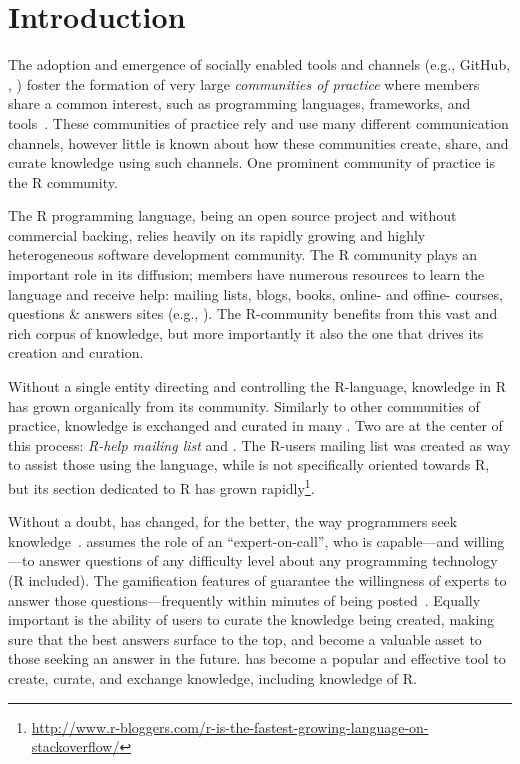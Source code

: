 \section{Introduction}
\label{cha:introduction}
The adoption and emergence of socially enabled tools and channels (e.g., GitHub, \SO, \ml) foster the formation of very large \textit{communities of practice} where members share a common interest, such as programming languages, frameworks, and tools~\cite{Storey2014}. These communities of practice rely and use many different communication channels, however little is known about how these communities create, share, and curate knowledge using such channels. One prominent community of practice is the R community.

The R programming language, being an open source project and without commercial backing, relies heavily on its rapidly growing and highly heterogeneous software development community. The R community plays an important role in its diffusion; members have numerous resources to learn the language and receive help: mailing lists, blogs, books, online- and offine- courses, questions \& answers sites (e.g., \SO). The R-community benefits from this vast and rich corpus of knowledge, but more importantly it also the one that drives its creation and curation.

Without a single entity directing and controlling the R-language, knowledge in R has grown organically from its community. Similarly to other communities of practice, knowledge is exchanged and curated in many \channels. Two \channels are at the center of this process: \textit{R-help mailing list} and \textit{\SO}. The R-users mailing list was created as way to assist those using the language, while \SO is not specifically oriented towards R, but its section dedicated to R has grown rapidly\footnote{\url{http://www.r-bloggers.com/r-is-the-fastest-growing-language-on-stackoverflow/}}.

Without a doubt, \SO has changed, for the better, the way programmers seek knowledge~\cite{???}. \SO assumes the role of an ``expert-on-call'', who is capable---and willing---to answer questions of any difficulty level about any programming technology (R included). The gamification features of \SO guarantee the willingness of experts to answer those questions---frequently within minutes of being posted~\cite{paper about how much time it takes for answer - mamykina}. Equally important is the ability of \SO users to curate the knowledge being created, making sure that the best answers surface to the top, and become a valuable asset to those seeking an answer in the future. \SO has become a popular and effective tool to create, curate, and exchange knowledge, including knowledge of R.


